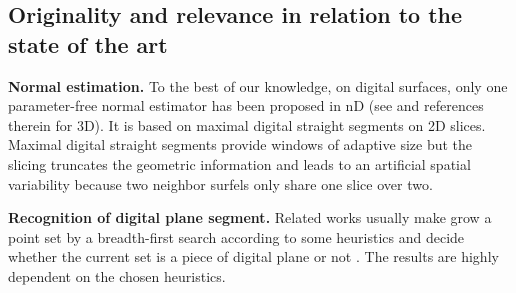 \subsection{Originality and relevance in relation to the state of the art}



\noindent\textbf{Normal estimation.}
To the best of our knowledge, on digital surfaces, only one parameter-free normal estimator
has been proposed in nD (see \cite{Lachaud2003} and references therein for 3D).
It is based on maximal digital straight segments on 2D slices.
Maximal digital straight segments provide windows of adaptive size
but the slicing truncates the geometric information and leads to
an artificial spatial variability because two neighbor surfels only
share one slice over two.

\noindent\textbf{Recognition of digital plane segment.}
Related works usually make grow a point set by a breadth-first search according to some heuristics and decide whether the current set is a piece of digital plane or not \cite{Sivignon2004,Charrier2011}. The results are highly dependent on the chosen heuristics.   


